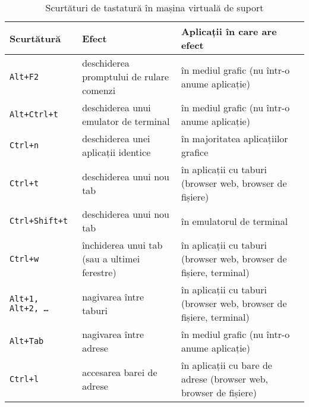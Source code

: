 \begin{table}[!htb]
  \caption{Scurtături de tastatură în mașina virtuală de suport}
  {\scriptsize
  \begin{center}
    \begin{tabular}{ p{} p{} p{} }
      \toprule
        \textbf{Scurtătură} &
        \textbf{Efect} &
        \textbf{Aplicații în care are efect} \\
      \midrule
        \texttt{Alt+F2} &
        deschiderea promptului de rulare comenzi &
        în mediul grafic (nu într-o anume aplicație) \\
        \midrule

        \texttt{Alt+Ctrl+t} &
        deschiderea unui emulator de terminal &
        în mediul grafic (nu într-o anume aplicație) \\
        \midrule

        \texttt{Ctrl+n} &
        deschiderea unei aplicații identice &
        în majoritatea aplicațiilor grafice \\
        \midrule

        \texttt{Ctrl+t} &
        deschiderea unui nou tab &
        în aplicații cu taburi (browser web, browser de fișiere) \\
        \midrule

        \texttt{Ctrl+Shift+t} &
        deschiderea unui nou tab &
        în emulatorul de terminal \\
        \midrule

        \texttt{Ctrl+w} &
        închiderea unui tab (sau a ultimei ferestre) &
        în aplicații cu taburi (browser web, browser de fișiere, terminal) \\
        \midrule

        \texttt{Alt+1, Alt+2, \ldots} &
        nagivarea între taburi &
        în aplicații cu taburi (browser web, browser de fișiere, terminal) \\
        \midrule

        \texttt{Alt+Tab} &
        nagivarea între adrese &
        în mediul grafic (nu într-o anume aplicație) \\
        \midrule

        \texttt{Ctrl+l} &
        accesarea barei de adrese &
        în aplicații cu bare de adrese (browser web, browser de fișiere) \\
        \midrule


\end{tabular}
\end{center}}
\end{table}
